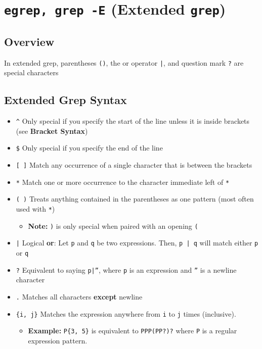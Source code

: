 \documentclass[13pt]{article}
\begin{document}
\section{\texttt{egrep, grep -E} (Extended \texttt{grep})}
\subsection{Overview}
In extended grep, parentheses \texttt{()}, the or operator \texttt{|}, and question mark \texttt{?} are special characters

\subsection{Extended Grep Syntax}
\begin{itemize}[leftmargin = 0pt]
\item [] \texttt{\^} Only special if you specify the start of the line unless it is inside brackets (see \textbf{Bracket Syntax})
\item [] \texttt{\$} Only special if you specify the end of the line
\item [] \texttt{[ ]} Match any occurrence of a single character that is between the brackets
\item [] \texttt{*} Match one or more occurrence to the character immediate left of \texttt{*}
\item [] \texttt{( )} Treats anything contained in the parentheses as one pattern (most often used with \texttt{*})
  \begin{itemize}[leftmargin = 0pt]
  \item [] \textbf{Note:} \texttt{)} is only special when paired with an opening \texttt{(}
  \end{itemize}
\item [] \texttt{|} Logical \textbf{or}: Let \texttt{p} and \texttt{q} be two expressions. Then, \texttt{p | q} will match either \texttt{p} or \texttt{q}
\item [] \texttt{?} Equivalent to saying \texttt{p|''}, where \texttt{p} is an expression and \texttt{''} is a newline character
\item[] \texttt{.} Matches all characters \textbf{except} newline
\item [] \texttt{\{i, j\}} Matches the expression anywhere from \texttt{i} to \texttt{j} times (inclusive). 
  \begin{itemize}[leftmargin = 0pt]
  \item [] \textbf{Example:} \texttt{P\{3, 5\}} is equivalent to \texttt{PPP(PP?)?} where \texttt{P} is a regular expression pattern. 

\end{itemize}
\end{itemize}
\end{document}
